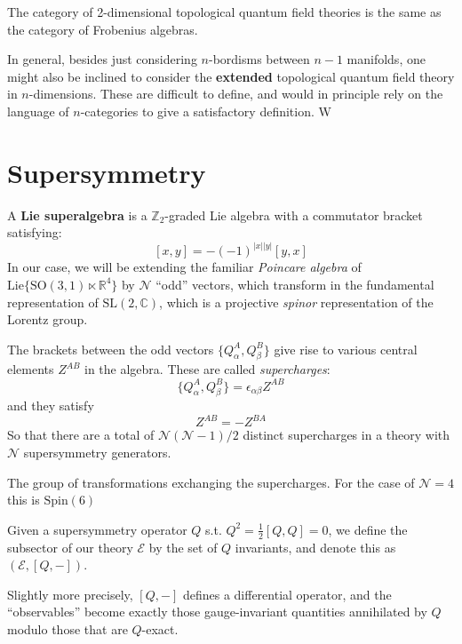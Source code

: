 	\begin{theorem}
		The category of 2-dimensional topological quantum field theories is the same as the category of Frobenius algebras.
	\end{theorem}
	
	In general, besides just considering $n$-bordisms between $n-1$ manifolds, one might also be inclined to consider the  \textbf{extended} topological quantum field theory in $n$-dimensions.
	These are difficult to define, and would in principle rely on the language of $n$-categories to give a satisfactory definition. W 
	

	\section{Supersymmetry} %
	\label{sec:supersymmetry}

	\begin{defn}
	A \textbf{Lie superalgebra} is a $\mathbb Z_2$-graded Lie algebra with a commutator bracket satisfying:
		$$[x, y]= -(-1)^{|x||y|} [y, x]$$
		In our case, we will be extending the familiar \emph{Poincare algebra} of $\mathrm{Lie}\{ \mathrm{SO}(3, 1) \ltimes \mathbb R^4  \}$ by $\mathcal N$ ``odd'' vectors, which transform in the fundamental representation of $\mathrm{SL(2, \mathbb C)}$, which is a projective \emph{spinor} representation of the Lorentz group. 
	\end{defn}
	The brackets between the odd vectors $\{Q^A_\alpha, Q^B_\beta \} $ give rise to various central elements $Z^{AB}$ in the algebra. These are called \emph{supercharges}:
	$$\{Q^A_\alpha, Q^B_\beta \} = \epsilon_{\alpha \beta} Z^{AB}$$
	and they satisfy
	$$Z^{AB} = -Z^{BA}$$
	So that there are a total of $\mathcal N (\mathcal N - 1)/2$ distinct supercharges in a theory with $\mathcal N$ supersymmetry generators. 
	\begin{defn}
		The group of transformations exchanging the supercharges. For the case of $\mathcal N = 4$ this is $\mathrm{Spin}(6)$
	\end{defn}
	
	\begin{defn}[Subsector]
		Given a supersymmetry operator $Q$ s.t. $Q^2 = \frac{1}{2} [Q, Q] = 0$, we define the subsector of our theory $\mathcal E$ by the set of $Q$ invariants, and denote this as $(\mathcal E, [Q, -])$.
		
		Slightly more precisely, $[Q, -]$ defines a differential operator, and the ``observables'' become exactly those gauge-invariant quantities annihilated by $Q$ modulo those that are $Q$-exact.
	\end{defn}

	